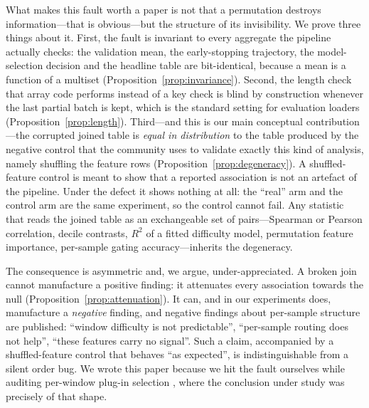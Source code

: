 \documentclass[a4paper,fleqn]{cas-sc}
\begin{document}
What makes this fault worth a paper is not that a permutation destroys
information---that is obvious---but the structure of its invisibility. We prove
three things about it. First, the fault is invariant to every aggregate the
pipeline actually checks: the validation mean, the early-stopping trajectory, the
model-selection decision and the headline table are bit-identical, because a mean
is a function of a multiset (Proposition~\ref{prop:invariance}). Second, the
length check that array code performs instead of a key check is blind by
construction whenever the last partial batch is kept, which is the standard
setting for evaluation loaders (Proposition~\ref{prop:length}). Third---and this
is our main conceptual contribution---the corrupted joined table is \emph{equal in
distribution} to the table produced by the negative control that the community
uses to validate exactly this kind of analysis, namely shuffling the feature rows
(Proposition~\ref{prop:degeneracy}). A shuffled-feature control is meant to show
that a reported association is not an artefact of the pipeline. Under the defect
it shows nothing at all: the ``real'' arm and the control arm are the same
experiment, so the control cannot fail. Any statistic that reads the joined table
as an exchangeable set of pairs---Spearman or Pearson correlation, decile
contrasts, $R^2$ of a fitted difficulty model, permutation feature importance,
per-sample gating accuracy---inherits the degeneracy.

The consequence is asymmetric and, we argue, under-appreciated. A broken join
cannot manufacture a positive finding: it attenuates every association towards
the null (Proposition~\ref{prop:attenuation}). It can, and in our experiments
does, manufacture a \emph{negative} finding, and negative findings about
per-sample structure are published: ``window difficulty is not predictable'',
``per-sample routing does not help'', ``these features carry no signal''. Such a
claim, accompanied by a shuffled-feature control that behaves ``as expected'', is
indistinguishable from a silent order bug. We wrote this paper because we hit the
fault ourselves while auditing per-window plug-in selection \citep{companion2026},
where the conclusion under study was precisely of that shape.
\end{document}
